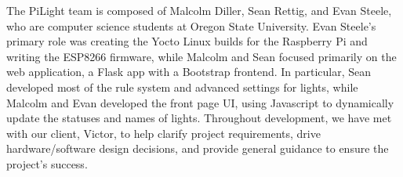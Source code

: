 The PiLight team is composed of Malcolm Diller, Sean Rettig, and Evan Steele,
who are computer science students at Oregon State University.  Evan Steele's
primary role was creating the Yocto Linux builds for the Raspberry Pi and
writing the ESP8266 firmware, while Malcolm and Sean focused primarily on the
web application, a Flask app with a Bootstrap frontend.  In particular, Sean
developed most of the rule system and advanced settings for lights, while
Malcolm and Evan developed the front page UI, using Javascript to dynamically
update the statuses and names of lights.  Throughout development, we have met
with our client, Victor, to help clarify project requirements, drive
hardware/software design decisions, and provide general guidance to ensure the
project's success.
